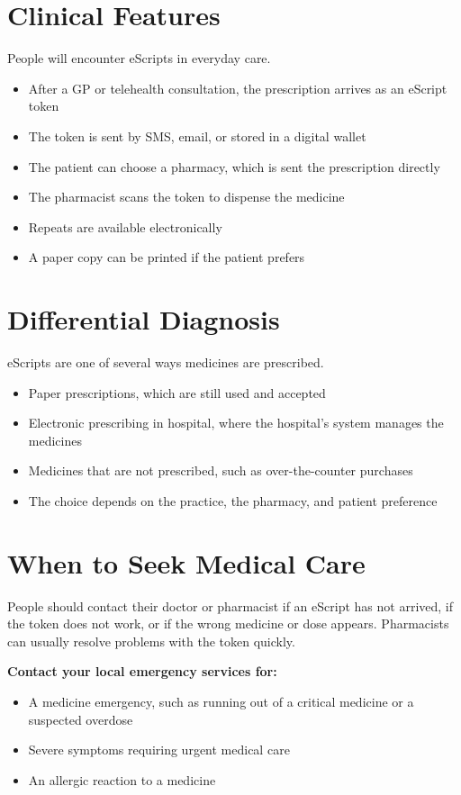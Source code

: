 \section*{Clinical Features}
People will encounter eScripts in everyday care.
\begin{itemize}
    \item After a GP or telehealth consultation, the prescription arrives as an eScript token
    \item The token is sent by SMS, email, or stored in a digital wallet
    \item The patient can choose a pharmacy, which is sent the prescription directly
    \item The pharmacist scans the token to dispense the medicine
    \item Repeats are available electronically
    \item A paper copy can be printed if the patient prefers
\end{itemize}

\section*{Differential Diagnosis}
eScripts are one of several ways medicines are prescribed.
\begin{itemize}
    \item Paper prescriptions, which are still used and accepted
    \item Electronic prescribing in hospital, where the hospital's system manages the medicines
    \item Medicines that are not prescribed, such as over-the-counter purchases
    \item The choice depends on the practice, the pharmacy, and patient preference
\end{itemize}

\section*{When to Seek Medical Care}
People should contact their doctor or pharmacist if an eScript has not arrived, if the token does not work, or if the wrong medicine or dose appears. Pharmacists can usually resolve problems with the token quickly.

\textbf{Contact your local emergency services for:}
\begin{itemize}
    \item A medicine emergency, such as running out of a critical medicine or a suspected overdose
    \item Severe symptoms requiring urgent medical care
    \item An allergic reaction to a medicine
\end{itemize}

